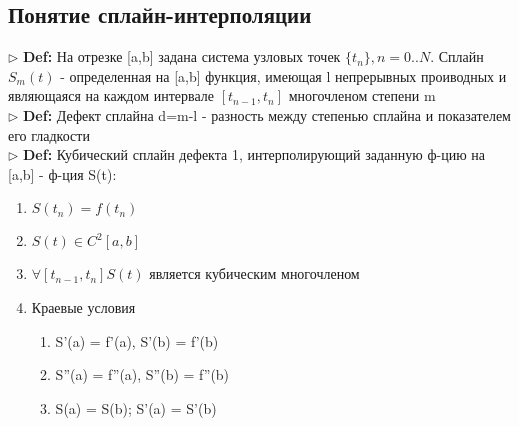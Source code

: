 \documentclass[a4paper]{article}
\begin{document}
\subsection{Понятие сплайн-интерполяции}

$\triangleright$ \textbf{Def:} На отрезке [a,b] задана система узловых точек $\{t_n\}, n=0..N$. Сплайн $S_m(t)$ - определенная на [a,b] функция, имеющая l непрерывных проиводных и являющаяся на каждом интервале $[t_{n-1}, t_n]$ многочленом степени m \\
$\triangleright$ \textbf{Def:} Дефект сплайна d=m-l - разность между степенью сплайна и показателем его гладкости \\
$\triangleright$ \textbf{Def:} Кубический сплайн дефекта 1, интерполирующий заданную ф-цию на [a,b] - ф-ция S(t):
\begin{enumerate}
	\item $S(t_n) = f(t_n)$
	\item $S(t) \in C^2[a,b]$
	\item $\forall [t_{n-1},t_n] S(t)$ является кубическим многочленом
	\item Краевые условия \begin{enumerate}
		\item S'(a) = f'(a), S'(b) = f'(b)
		\item S''(a) = f''(a), S''(b) = f''(b)
		\item S(a) = S(b); S'(a) = S'(b)
	\end{enumerate}
\end{enumerate}
\end{document}
